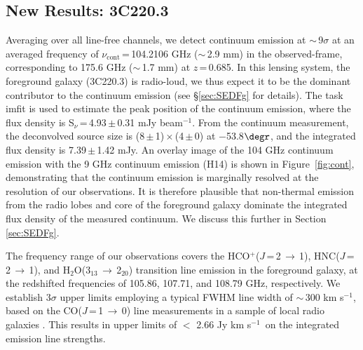 \documentclass[iop]{emulateapj}
\newcommand{\rarr}{$\rightarrow$}
\newcommand{\pmOne}{\mbox{$^{-1}$}}
\begin{document}
\subsection{New Results: 3C220.3}
Averaging over all line-free channels, we detect continuum emission at $\sim$\,9$\sigma$ at an averaged frequency of $\nu_\textrm{cont}$\,=\,104.2106 GHz ($\sim$\,2.9 mm) in the observed-frame, corresponding to 175.6 GHz ($\sim$\,1.7 mm) at $z$\,=\,0.685. In this lensing system, the
foreground galaxy (3C220.3) is radio-loud, we thus expect it to be the dominant contributor to the continuum emission (see \S \ref{sec:SEDFg} for details). The task {\sc imfit} is used to estimate the peak position of the continuum emission, where the flux density is S$_\nu$\,=\,4.93\,$\pm$\,0.31\,\,mJy\,\,beam\pmOne. From the continuum measurement, the deconvolved source size
is (8\,$\pm$\,1)\,$\times$\,(4\,$\pm$\,0) at $-$53.8$\degr$, and the integrated flux density is 7.39\,$\pm$\,1.42\,\,mJy. An overlay image of the 104 GHz
continuum emission with the 9 GHz continuum emission (H14) is shown in Figure~\ref{fig:cont}, demonstrating that the continuum
emission is marginally resolved at the resolution of our observations. It is therefore plausible that non-thermal emission from the radio lobes and core of the foreground galaxy dominate the integrated flux
density of the measured continuum. We discuss this further in Section \ref{sec:SEDFg}. \par
The frequency range of our observations covers the HCO$^+$($J$\,=\,2\,\rarr\,1), HNC($J$\,=\,2\,$\rightarrow$\,1), and H$_2$O(3$_{13}$\,\rarr\,2$_{20}$)
transition line emission in the foreground galaxy, at
the redshifted frequencies of 105.86, 107.71, and 108.79\,\,GHz, respectively. We establish 3$\sigma$ upper limits employing a typical FWHM line width of
$\sim$\,300\,\,km\,\,s\pmOne, based on the CO($J$\,=\,1\,$\rightarrow$\,0) line measurements in a sample of local radio galaxies \citep[$z$ $<$ 0.1; ][]{Smolcic11a}. This results in upper limits of $<$ 2.66\,\,Jy\,\,km\,\,s\pmOne\ on the integrated emission line strengths.
\end{document}
